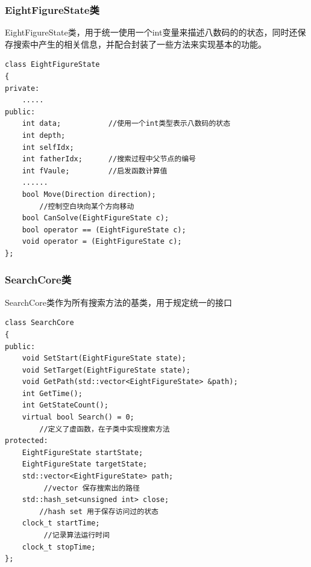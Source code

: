 \documentclass[12pt,a4paper]{article}
\begin{document}
\subsubsection{EightFigureState类}
EightFigureState类，用于统一使用一个int变量来描述八数码的的状态，同时还保存搜索中产生的相关信息，并配合封装了一些方法来实现基本的功能。
\begin{lstlisting}
class EightFigureState
{
private:
   	.....
public:
    int data;			//使用一个int类型表示八数码的状态
    int depth;
    int selfIdx;
    int fatherIdx;		//搜索过程中父节点的编号
    int fVaule;			//启发函数计算值
    ......
    bool Move(Direction direction);		
    	//控制空白块向某个方向移动
    bool CanSolve(EightFigureState c);
    bool operator == (EightFigureState c);
    void operator = (EightFigureState c);
};
\end{lstlisting}
\subsubsection{SearchCore类}
SearchCore类作为所有搜索方法的基类，用于规定统一的接口
\begin{lstlisting}
class SearchCore
{
public:
    void SetStart(EightFigureState state);
    void SetTarget(EightFigureState state);
    void GetPath(std::vector<EightFigureState> &path);
    int GetTime();
    int GetStateCount();
    virtual bool Search() = 0;			
    	//定义了虚函数，在子类中实现搜索方法
protected:
    EightFigureState startState;
    EightFigureState targetState;
    std::vector<EightFigureState> path;		
   		 //vector 保存搜索出的路径
    std::hash_set<unsigned int> close;			
    	//hash set 用于保存访问过的状态
    clock_t startTime;									
   		 //记录算法运行时间
    clock_t stopTime;
};
\end{lstlisting}
\end{document}
